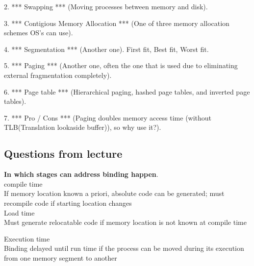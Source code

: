 \documentclass[a4paper,10pt,titlepage]{report}
\begin{document}
		
		
	2. *** Swapping *** (Moving processes between memory and disk).
	
	
	3. *** Contigious Memory Allocation *** (One of three memory allocation schemes OS's can use).
	
	
	4. *** Segmentation *** (Another one).
			First fit,
			Best fit,
			Worst fit.	
	
	5. *** Paging *** (Another one, often the one that is used due to eliminating external fragmentation completely).
	
	
	
	6. *** Page table *** (Hierarchical paging, hashed page tables, and inverted page tables).
	
	
	
	7. *** Pro / Cons *** (Paging doubles memory access time (without TLB(Translation lookaside buffer)), so why use it?).

\newpage
\subsection{Questions from lecture}
\textbf{In which stages can address binding happen}.\\
\hspace{10mm} compile time \\
\hspace{15mm} If memory location known a priori, absolute code can be generated; must recompile code if starting location changes \\



\hspace{10mm} Load time\\
\hspace{15mm} Must generate relocatable code if memory location is not known at compile time



\hspace{10mm} Execution time \\
\hspace{15mm} Binding delayed until run time if the process can be moved during its execution from one memory segment to another \\

\vspace{5mm}
\end{document}
